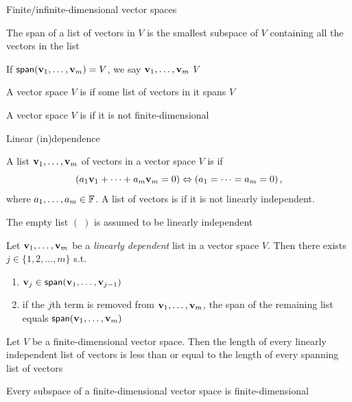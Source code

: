\documentclass[aspectratio=169]{beamer}
\begin{document}
\begin{frame}{Finite/infinite-dimensional vector spaces}
\begin{theorem}
The span of a list of vectors in $V$ is the smallest subspace of $V$ containing all the vectors in the list
\end{theorem}
\begin{definition}
If $\mathsf{span}(\mathbf{v}_1,\ldots,\mathbf{v}_m)=V$, we say $\mathbf{v}_1,\ldots,\mathbf{v}_m$  $V$
\end{definition}
\begin{definition}
A vector space $V$ is  if some list of vectors in it spans $V$
\end{definition}
\begin{definition}
A vector space $V$ is  if it is not finite-dimensional
\end{definition}
\end{frame}


\begin{frame}{Linear (in)dependence}
\begin{definition}
A list $\mathbf{v}_1,\ldots,\mathbf{v}_m$ of vectors in a vector space $V$ is  if
\[
\left(a_1\mathbf{v}_1+\cdots+a_m\mathbf{v}_m=0\right)
\Leftrightarrow
\left(a_1=\cdots=a_m=0\right),
\]
where $a_1,\ldots,a_m\in\mathbb{F}$. 
A list of vectors is  if it is not linearly independent.
\end{definition}
The empty list $(\;)$ is assumed to be linearly independent
\end{frame}


\begin{frame}
\begin{lemma}
Let $\mathbf{v}_1,\ldots,\mathbf{v}_m$ be a \emph{linearly dependent} list in a vector space $V$. Then there exists $j\in\{1,2,\ldots,m\}$ s.t.
\begin{enumerate}
\item $\mathbf{v}_j\in\mathsf{span}(\mathbf{v}_1,\ldots,\mathbf{v}_{j-1})$
\item if the $j$th term is removed from $\mathbf{v}_1,\ldots,\mathbf{v}_m$, the span of the remaining list equals $\mathsf{span}(\mathbf{v}_1,\ldots,\mathbf{v}_m)$
\end{enumerate}
\end{lemma}
\begin{importanttheorem}
Let $V$ be a finite-dimensional vector space. Then the length of every linearly independent list of vectors is less than or equal to the length of every spanning list of vectors
\end{importanttheorem}
\begin{importanttheorem}
Every subspace of a finite-dimensional vector space is finite-dimensional
\end{importanttheorem}
\end{frame}
\end{document}
